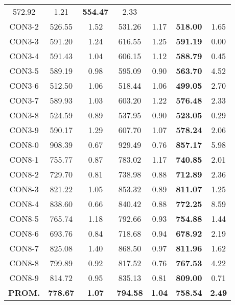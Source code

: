 \begin{table}[ht]
\begin{tabular}{c c c c c c c}
572.92 & 1.21 & \bf{554.47} & 
2.33\\CON3-2 & 526.55 & 1.52 & 
531.26 & 1.17 & \bf{518.00} & 
1.65\\CON3-3 & 591.20 & 1.24 & 
616.55 & 1.25 & \bf{591.19} & 
0.00\\CON3-4 & 591.43 & 1.04 & 
606.15 & 1.12 & \bf{588.79} & 
0.45\\CON3-5 & 589.19 & 0.98 & 
595.09 & 0.90 & \bf{563.70} & 
4.52\\CON3-6 & 512.50 & 1.06 & 
518.44 & 1.06 & \bf{499.05} & 
2.70\\CON3-7 & 589.93 & 1.03 & 
603.20 & 1.22 & \bf{576.48} & 
2.33\\CON3-8 & 524.59 & 0.89 & 
537.95 & 0.90 & \bf{523.05} & 
0.29\\CON3-9 & 590.17 & 1.29 & 
607.70 & 1.07 & \bf{578.24} & 
2.06\\CON8-0 & 908.39 & 0.67 & 
929.49 & 0.76 & \bf{857.17} & 
5.98\\CON8-1 & 755.77 & 0.87 & 
783.02 & 1.17 & \bf{740.85} & 
2.01\\CON8-2 & 729.70 & 0.81 & 
738.98 & 0.88 & \bf{712.89} & 
2.36\\CON8-3 & 821.22 & 1.05 & 
853.32 & 0.89 & \bf{811.07} & 
1.25\\CON8-4 & 838.60 & 0.66 & 
840.42 & 0.88 & \bf{772.25} & 
8.59\\CON8-5 & 765.74 & 1.18 & 
792.66 & 0.93 & \bf{754.88} & 
1.44\\CON8-6 & 693.76 & 0.84 & 
718.68 & 0.94 & \bf{678.92} & 
2.19\\CON8-7 & 825.08 & 1.40 & 
868.50 & 0.97 & \bf{811.96} & 
1.62\\CON8-8 & 799.89 & 0.92 & 
817.52 & 0.76 & \bf{767.53} & 
4.22\\CON8-9 & 814.72 & 0.95 & 
835.13 & 0.81 & \bf{809.00} & 
0.71\\\bf{PROM.} & 
\bf{778.67} & \bf{1.07} & \bf{794.58} & \bf{1.04} & \bf{758.54} & \bf{2.49}\\[1ex]\hline
\end{tabular}
\label{table:nonlin}
\end{table} \clearpage
